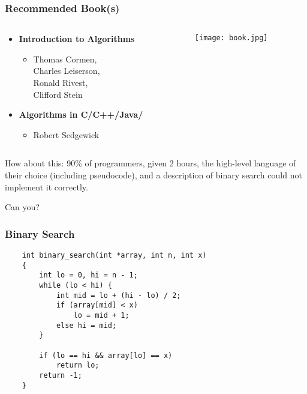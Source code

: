 \documentclass[svgnames,dvipsnames,usenames]{beamer}
\begin{document}
\begin{frame}
    \frametitle{Recommended Book(s)}
    \begin{columns}[t]
        \begin{column}[T]{5cm}
            \begin{itemize}
                \item \textbf{Introduction to Algorithms}
                    \begin{itemize}
                        \item Thomas Cormen,\\ Charles Leiserson,\\ Ronald Rivest,\\ Clifford Stein
                    \end{itemize}
                \item \textbf{Algorithms in C/C++/Java/}
                    \begin{itemize}
                        \item Robert Sedgewick
                    \end{itemize}
            \end{itemize}
        \end{column}
        \begin{column}[T]{5cm}
            \texttt{[image: book.jpg]}
        \end{column}
    \end{columns}
\end{frame}


\begin{frame}
    How about this: 90\% of programmers, given 2 hours, the high-level language of their choice (including pseudocode), and a description of binary search could not implement it correctly.

    \vspace{15mm}
    \pause
    Can you?
\end{frame}

\begin{frame}[fragile]
    \frametitle{Binary Search}
    \begin{lstlisting}
    int binary_search(int *array, int n, int x)
    {
        int lo = 0, hi = n - 1;
        while (lo < hi) {
            int mid = lo + (hi - lo) / 2;
            if (array[mid] < x)
                lo = mid + 1;
            else hi = mid;
        }

        if (lo == hi && array[lo] == x)
            return lo;
        return -1;
    }
    \end{lstlisting}
\end{frame}
\end{document}
